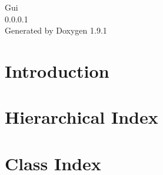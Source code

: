 \let\mypdfximage\pdfximage\def\pdfximage{\immediate\mypdfximage}\documentclass[twoside]{book}
\newcommand{\+}{\discretionary{\mbox{\scriptsize$\hookleftarrow$}}{}{}}
\newcommand{\clearemptydoublepage}{%
  \newpage{\pagestyle{empty}\cleardoublepage}%
}
\begin{document}
\raggedbottom

\hypersetup{pageanchor=false,
             bookmarksnumbered=true,
             pdfencoding=unicode
            }
\begin{titlepage}
\vspace*{7cm}
\begin{center}%
{\Large Gui \\[1ex]\large 0.\+0.\+0.\+1 }\\
\vspace*{1cm}
{\large Generated by Doxygen 1.9.1}\\
\end{center}
\end{titlepage}
\clearemptydoublepage
{}
\tableofcontents
\clearemptydoublepage
{}
\hypersetup{pageanchor=true}

\chapter{Introduction}
\label{md__d__tvgui__t_v_gui__r_e_a_d_m_e}

\chapter{Hierarchical Index}

\chapter{Class Index}

\end{document}
